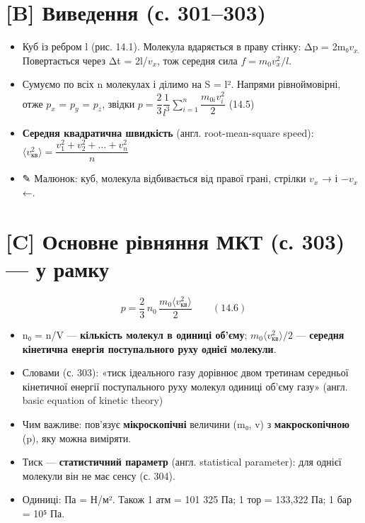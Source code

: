 \documentclass[11pt,a4paper,oneside]{book}
\newcommand{\pen}{{\sffamily\color{accent}✎}}
\begin{document}
\section*{[B] Виведення (с. 301–303)}
\begin{itemize}
\item Куб із ребром l (рис. 14.1). Молекула вдаряється в праву стінку: Δp = 2m₀$v_{x.}$ Повертається через Δt = 2l/$v_{x}$, тож середня сила $f = m_0v_x^2/l$.
\item Сумуємо по всіх n молекулах і ділимо на S = l². Напрями рівноймовірні, отже $p_{x}$ = $p_{y}$ = $p_{z}$, звідки
$p = \dfrac23\dfrac1{l^3}\sum_{i=1}^n\dfrac{m_{0i}v_i^2}{2}$ (14.5)
\item \textbf{Середня квадратична швидкість} (англ. root-mean-square speed): $\langle v_{\text{кв}}^2\rangle = \dfrac{v_1^2+v_2^2+\ldots+v_n^2}{n}$
\item \pen{} Малюнок: куб, молекула відбивається від правої грані, стрілки $v_{x}$ → і −$v_{x}$ ←.
\end{itemize}

\section*{[C] Основне рівняння МКТ (с. 303) — у рамку}
\[p = \frac23\,n_0\,\frac{m_0\langle v_{\text{кв}}^2\rangle}{2}\qquad(14.6)\]
\begin{itemize}
\item n₀ = n/V — \textbf{кількість молекул в одиниці об'єму}; $m_0\langle v_{\text{кв}}^2\rangle/2$ — \textbf{середня кінетична енергія поступального руху однієї молекули}.
\item Словами (с. 303): «тиск ідеального газу дорівнює двом третинам середньої кінетичної енергії поступального руху молекул одиниці об'єму газу» (англ. basic equation of kinetic theory)
\item Чим важливе: пов'язує \textbf{мікроскопічні} величини (m₀, v) з \textbf{макроскопічною} (p), яку можна виміряти.
\item Тиск — \textbf{статистичний параметр} (англ. statistical parameter): для однієї молекули він не має сенсу (с. 304).
\item Одиниці: Па = Н/м². Також 1 атм = 101 325 Па; 1 тор = 133,322 Па; 1 бар = 10⁵ Па.
\end{itemize}
\end{document}
